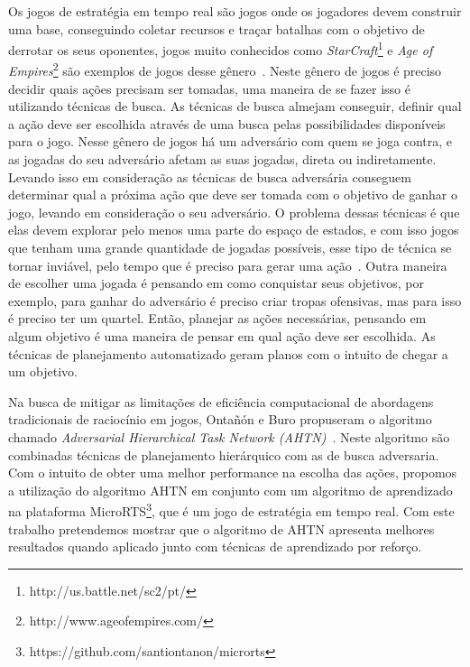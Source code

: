 Os jogos de estratégia em tempo real são jogos onde os jogadores devem construir uma base, conseguindo coletar recursos e traçar batalhas com o objetivo de derrotar os seus oponentes, jogos muito conhecidos como \textit{StarCraft}\footnote{http://us.battle.net/sc2/pt/} e \textit{Age of Empires}\footnote{http://www.ageofempires.com/} são exemplos de jogos desse gênero~\cite{ontanon2013survey}.
Neste gênero de jogos é preciso decidir quais ações precisam ser tomadas, uma maneira de se fazer isso é utilizando técnicas de busca. As técnicas de busca almejam conseguir, definir qual a ação deve ser escolhida através de uma busca pelas possibilidades disponíveis para o jogo. 
Nesse gênero de jogos há um adversário com quem se joga contra, e as jogadas do seu adversário afetam as suas jogadas, direta ou indiretamente. Levando isso em consideração as técnicas de busca adversária conseguem determinar qual a próxima ação que deve ser tomada com o objetivo de ganhar o jogo, levando em consideração o seu adversário. O problema dessas técnicas é que elas devem explorar pelo menos uma parte do espaço de estados, e com isso jogos que tenham uma grande quantidade de jogadas possíveis, esse tipo de técnica se tornar inviável, pelo tempo que é preciso para gerar uma ação~\cite{ontanon2012experiments}.
Outra maneira de escolher uma jogada é pensando em como conquistar seus objetivos, por exemplo, para ganhar do adversário é preciso criar tropas ofensivas, mas para isso é preciso ter um quartel. Então, planejar as ações necessárias, pensando em algum objetivo é uma maneira de pensar em qual ação deve ser escolhida. As técnicas de planejamento automatizado geram planos com o intuito de chegar a um objetivo. 

Na busca de mitigar as limitações de eficiência computacional de abordagens tradicionais de raciocínio em jogos, Ontañón e Buro propuseram o algoritmo chamado \textit{Adversarial Hierarchical Task Network (AHTN)}~\cite{ontanon2015adversarial}. 
Neste algoritmo são combinadas técnicas de planejamento hierárquico com as de busca adversaria. 
Com o intuito de obter uma melhor performance na escolha das ações, propomos a utilização do algoritmo AHTN em conjunto com um algoritmo de aprendizado na plataforma MicroRTS\footnote{https://github.com/santiontanon/microrts}, que é um jogo de estratégia em tempo real. 
Com este trabalho pretendemos mostrar que o algoritmo de AHTN apresenta melhores resultados quando aplicado junto com técnicas de aprendizado por reforço. 

